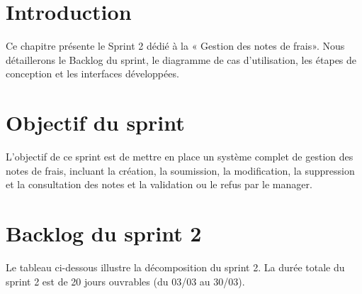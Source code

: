 \documentclass[12pt,a4paper]{report}
\begin{document}
\section*{Introduction}


Ce chapitre présente le Sprint 2 dédié à la « Gestion des notes de frais». Nous détaillerons le Backlog du sprint, le diagramme de cas d'utilisation, les étapes de conception et les interfaces développées.



\section{Objectif du sprint}

L'objectif de ce sprint est de mettre en place un système complet de gestion des notes de frais, incluant la création, la soumission, la modification, la suppression et la consultation des notes et la validation ou le refus par le manager.



\section{Backlog du sprint 2}

Le tableau ci-dessous illustre la décomposition du sprint 2. La durée totale du sprint 2 est de 20 jours ouvrables (du 03/03 au 30/03).




\label{tab:sprint2_combined}
\end{document}
